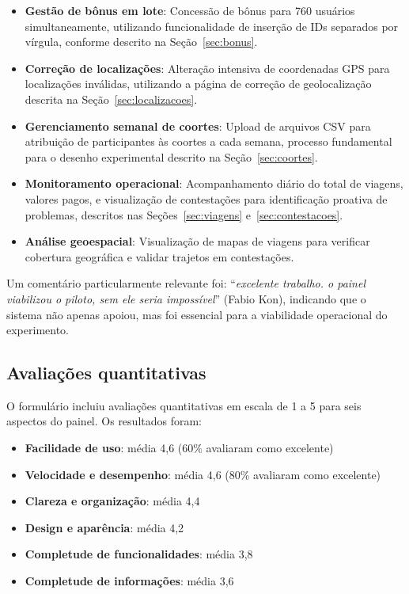 \begin{itemize}
  \item \textbf{Gestão de bônus em lote}: Concessão de bônus para 760 usuários simultaneamente, utilizando funcionalidade de inserção de IDs separados por vírgula, conforme descrito na Seção~\ref{sec:bonus}.
  \item \textbf{Correção de localizações}: Alteração intensiva de coordenadas GPS para localizações inválidas, utilizando a página de correção de geolocalização descrita na Seção~\ref{sec:localizacoes}.
  \item \textbf{Gerenciamento semanal de coortes}: Upload de arquivos CSV para atribuição de participantes às coortes a cada semana, processo fundamental para o desenho experimental descrito na Seção~\ref{sec:coortes}.
  \item \textbf{Monitoramento operacional}: Acompanhamento diário do total de viagens, valores pagos, e visualização de contestações para identificação proativa de problemas, descritos nas Seções~\ref{sec:viagens} e~\ref{sec:contestacoes}.
  \item \textbf{Análise geoespacial}: Visualização de mapas de viagens para verificar cobertura geográfica e validar trajetos em contestações.
\end{itemize}

Um comentário particularmente relevante foi: ``\textit{excelente trabalho. o painel viabilizou o piloto, sem ele seria impossível}'' (Fabio Kon), indicando que o sistema não apenas apoiou, mas foi essencial para a viabilidade operacional do experimento.

\subsection{Avaliações quantitativas}

O formulário incluiu avaliações quantitativas em escala de 1 a 5 para seis aspectos do painel. Os resultados foram:

\begin{itemize}
  \item \textbf{Facilidade de uso}: média 4,6 (60\% avaliaram como excelente)
  \item \textbf{Velocidade e desempenho}: média 4,6 (80\% avaliaram como excelente)
  \item \textbf{Clareza e organização}: média 4,4
  \item \textbf{Design e aparência}: média 4,2
  \item \textbf{Completude de funcionalidades}: média 3,8
  \item \textbf{Completude de informações}: média 3,6
\end{itemize}

